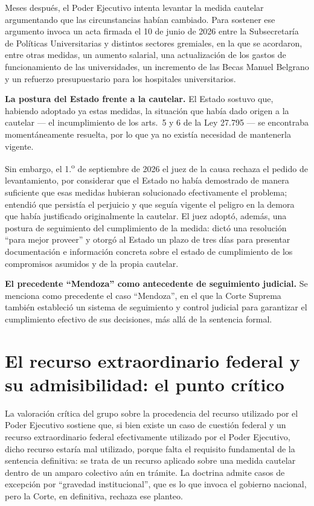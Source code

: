 \documentclass[12pt,oneside]{book}
\begin{document}
Meses después, el Poder Ejecutivo intenta levantar la medida cautelar argumentando que las circunstancias habían cambiado. Para sostener ese argumento invoca un acta firmada el 10 de junio de 2026 entre la Subsecretaría de Políticas Universitarias y distintos sectores gremiales, en la que se acordaron, entre otras medidas, un aumento salarial, una actualización de los gastos de funcionamiento de las universidades, un incremento de las Becas Manuel Belgrano y un refuerzo presupuestario para los hospitales universitarios.

\begin{note}
\textbf{La postura del Estado frente a la cautelar.} El Estado sostuvo que, habiendo adoptado ya estas medidas, la situación que había dado origen a la cautelar --- el incumplimiento de los arts.\ 5 y 6 de la Ley 27.795 --- se encontraba momentáneamente resuelta, por lo que ya no existía necesidad de mantenerla vigente.
\end{note}

Sin embargo, el 1.\textsuperscript{o} de septiembre de 2026 el juez de la causa rechaza el pedido de levantamiento, por considerar que el Estado no había demostrado de manera suficiente que esas medidas hubieran solucionado efectivamente el problema; entendió que persistía el perjuicio y que seguía vigente el peligro en la demora que había justificado originalmente la cautelar. El juez adoptó, además, una postura de seguimiento del cumplimiento de la medida: dictó una resolución ``para mejor proveer'' y otorgó al Estado un plazo de tres días para presentar documentación e información concreta sobre el estado de cumplimiento de los compromisos asumidos y de la propia cautelar.

\begin{note}
\textbf{El precedente ``Mendoza'' como antecedente de seguimiento judicial.} Se menciona como precedente el caso ``Mendoza'', en el que la Corte Suprema también estableció un sistema de seguimiento y control judicial para garantizar el cumplimiento efectivo de sus decisiones, más allá de la sentencia formal.
\end{note}

\section{El recurso extraordinario federal y su admisibilidad: el punto crítico}

La valoración crítica del grupo sobre la procedencia del recurso utilizado por el Poder Ejecutivo sostiene que, si bien existe un caso de cuestión federal y un recurso extraordinario federal efectivamente utilizado por el Poder Ejecutivo, dicho recurso estaría mal utilizado, porque falta el requisito fundamental de la sentencia definitiva: se trata de un recurso aplicado sobre una medida cautelar dentro de un amparo colectivo aún en trámite. La doctrina admite casos de excepción por ``gravedad institucional'', que es lo que invoca el gobierno nacional, pero la Corte, en definitiva, rechaza ese planteo.
\end{document}
